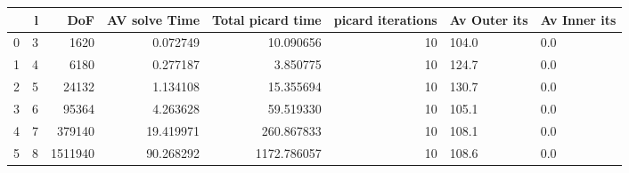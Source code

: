 \begin{tabular}{lrrrrrll}
\toprule
{} &  l &      DoF &  AV solve Time &  Total picard time &  picard iterations & Av Outer its & Av Inner its \\
\midrule
0 &  3 &     1620 &       0.072749 &          10.090656 &                 10 &        104.0 &          0.0 \\
1 &  4 &     6180 &       0.277187 &           3.850775 &                 10 &        124.7 &          0.0 \\
2 &  5 &    24132 &       1.134108 &          15.355694 &                 10 &        130.7 &          0.0 \\
3 &  6 &    95364 &       4.263628 &          59.519330 &                 10 &        105.1 &          0.0 \\
4 &  7 &   379140 &      19.419971 &         260.867833 &                 10 &        108.1 &          0.0 \\
5 &  8 &  1511940 &      90.268292 &        1172.786057 &                 10 &        108.6 &          0.0 \\
\bottomrule
\end{tabular}

